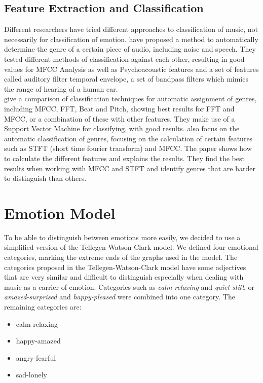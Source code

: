 \documentclass{sigchi-ext}
\begin{document}
\subsection{Feature Extraction and Classification}
Different researchers have tried different approaches to classification of music, not necessarily for classification of emotion. \cite{Mckinney2003} have proposed a method to automatically determine the genre of a certain piece of audio, including noise and speech. They tested different methods of classification against each other, resulting in good values for MFCC Analysis as well as Psychoacoustic features and a set of features called auditory filter temporal envelope, a set of bandpass filters which mimics the range of hearing of a human ear.\\

\cite{Li2003} give a comparison of classification techniques for automatic assignment of genres, including MFCC, FFT, Beat and Pitch, showing best results for FFT and MFCC, or a combination of these with other features. They make use of a Support Vector Machine for classifying, with good results.
\cite{Tzanetakis2001} also focus on the automatic classification of genres, focusing on the calculation of certain features such as STFT (short time fourier transform) and MFCC. The paper shows how to calculate the different features and explains the results. They find the best results when working with MFCC and STFT and identify genres that are harder to distinguish than others.

\section{Emotion Model}
To be able to distinguish between emotions more easily, we decided to use a simplified version of the Tellegen-Watson-Clark model. We defined four emotional categories, marking the extreme ends of the graphs used in the model. The categories proposed in the Tellegen-Watson-Clark model have some adjectives that are very similar and difficult to distinguish especially when dealing with music as a carrier of emotion. Categories such as \textit{calm-relaxing} and \textit{quiet-still}, or \textit{amazed-surprised} and \textit{happy-pleased} were combined into one category. The remaining categories are:

\begin{itemize}
	\item calm-relaxing
	\item happy-amazed
	\item angry-fearful
	\item sad-lonely
\end{itemize}
\end{document}
